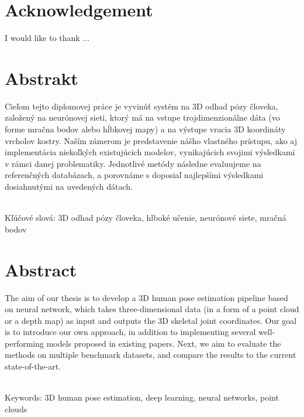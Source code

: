 \documentclass[12pt, a4paper, oneside]{book}
\begin{document}
\chapter*{Acknowledgement}\label{chap:thank_you}
I would like to thank ... %

\chapter*{Abstrakt}\label{chap:abstract_sk}
Cieľom tejto diplomovej práce je vyvinúť systém na 3D odhad pózy človeka, založený na neurónovej sieti, ktorý má na vstupe trojdimenzionálne dáta (vo forme mračna bodov alebo hĺbkovej mapy) a na výstupe vracia 3D koordináty vrcholov kostry. Naším zámerom je predstavenie nášho vlastného prístupu, ako aj implementácia niekoľkých existujúcich modelov, vynikajúcich svojimi výsledkami v rámci danej problematiky. Jednotlivé metódy následne evaluujeme na referenčných databázach, a porovnáme s doposiaľ najlepšími výsledkami dosiahnutými na uvedených dátach.

~\\
Kľúčové slová: 3D odhad pózy človeka, hlboké učenie, neurónové siete, mračná bodov
\vfill\eject 

\chapter*{Abstract}\label{chap:abstract_en}
The aim of our thesis is to develop a 3D human pose estimation pipeline based on neural network, which takes three-dimensional data (in a form of a point cloud or a depth map) as input and outputs the 3D skeletal joint coordinates. Our goal is to introduce our own approach, in addition to implementing several well-performing models proposed in existing papers. Next, we aim to evaluate the methods on multiple benchmark datasets, and compare the results to the current state-of-the-art.

~\\
Keywords: 3D human pose estimation, deep learning, neural networks, point clouds
\vfill\eject 


\tableofcontents

\listoftables
\listoffigures

\mainmatter










\backmatter

\nocite{*}


\end{document}
